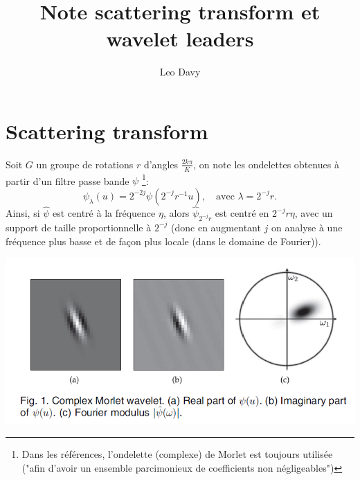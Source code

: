 \documentclass[11pt]{article} %
\title{Note scattering transform et wavelet leaders}
\author{Leo Davy}
\begin{document}
\maketitle

\section{Scattering transform}
\par
Soit $G$ un groupe de rotations $r$ d'angles $\frac{2k\pi}{K}$, on note les ondelettes obtenues à partir d'un filtre passe bande $\psi$ \footnote{Dans les références, l'ondelette (complexe) de Morlet est toujours utilisée ("afin d'avoir un ensemble parcimonieux de coefficients non négligeables")}:
\begin{equation}
	\psi_\lambda(u) = 2^{-2j}\psi (2^{-j}r^{-1}u),\quad \text{avec $\lambda=2^{-j}r$.}
\end{equation}
Ainsi, si $\hat{\psi}$ est centré à la fréquence $\eta$, alors $\hat{\psi}_{2^{-j}r}$ est centré en $2^{-j}r\eta$, avec un support de taille proportionnelle à $2^{-j}$ (donc en augmentant $j$ on analyse à une fréquence plus basse et de façon plus locale (dans le domaine de Fourier)). 
\newline

\includegraphics[width=\textwidth]{wav_morlet}
\end{document}
